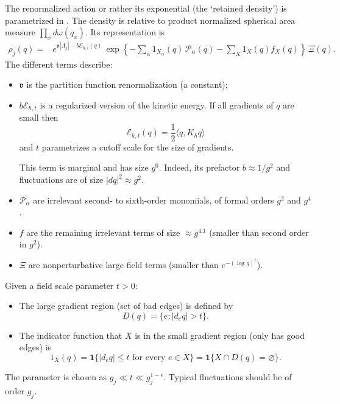 \documentclass[11pt]{article}
\numberwithin{equation}{section}
\theoremstyle{definition}
\theoremstyle{plain}
\begin{document}
The renormalized action or rather its exponential (the `retained density') is parametrized in \cite[(3.29)]{OpenAI-O3}.
The density is relative to product normalized spherical area measure $\prod_xd\omega(q_x)$.
Its representation is
\begin{equation}
\begin{aligned}
 \rho_j(q)={}&
 e^{\mathfrak v|\Lambda_j|-b\mathcal E_{h,t}(q)}\,
 \exp\!\left\{
 -\sum_{\alpha}
       1_{X_\alpha}(q)\,\mathcal P_\alpha(q)
 -\sum_X1_X(q)f_X(q)\right\}\,\Xi(q).
 \end{aligned}
 \label{eq:density}
\end{equation}
The different terms describe:
\begin{itemize}
\item $\mathfrak v$ is the partition function renormalization (a constant);
\item $b \mathcal E_{h,t}$ is a regularized version of the kinetic energy. If all gradients of $q$
are small then
\begin{equation}
\mathcal E_{h,t}(q) = \frac12 \langle q, K_h q\rangle
\end{equation}
and $t$ parametrizes a cutoff scale for the size of gradients.

This term is marginal and has size $g^0$. Indeed, its prefactor $b\approx 1/g^2$ and fluctuations are of size $|dq|^2 \approx g^2$.

\item $\mathcal P_\alpha$ are irrelevant second- to sixth-order monomials, of formal orders $g^2$ and $g^4$.
\item $f$ are the remaining irrelevant terms of size $\approx g^{4.1}$ (smaller than second order in $g^2$). 
\item $\Xi$ are nonperturbative large field terms (smaller than $e^{-(\log g)^\epsilon}$).
\end{itemize}
%
Given a field scale parameter $t>0$:
\begin{itemize}
\item 
The large gradient region (set of bad edges) is defined by
\begin{equation}
 D(q)=\{e: |d_e q|>t\}.
 \label{eq:bad-edges}
\end{equation}
\item
The indicator function that $X$ is in the small gradient region (only has good edges) is
\begin{equation}
 1_X(q)=\mathbf1\{|d_eq| \le  t\text{ for every }e\in X\}
 =\mathbf1\{X\cap D(q) = \varnothing\}.
 \label{eq:mask}
\end{equation}
\end{itemize}
 The parameter is chosen as $g_j \ll t \ll g_j^{1-\epsilon}$. Typical fluctuations should be of order $g_j$.
\end{document}
